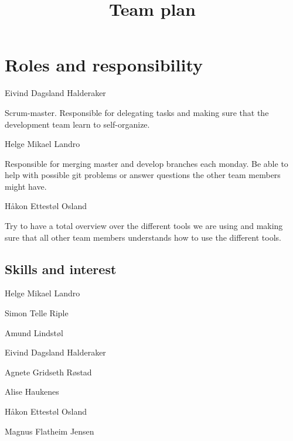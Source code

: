\documentclass{article}
\title{Team plan}
\begin{document}
\date{}
\maketitle
{}

\section*{Roles and responsibility}
\begin{description}[align=right]
\item [Leader:] \hspace{6 mm} Eivind Dagsland Halderaker
\item \hspace*{4 mm} Scrum-master. Responsible for delegating tasks and making sure that the development team learn to self-organize. 
\item [Git repo:] \hspace{6 mm} Helge Mikael Landro
\item \hspace*{4 mm} Responsible for merging master and develop branches each monday. Be able to help with possible git problems or answer questions the other team members might have.
\item [Tools:] \hspace{6 mm} Håkon Ettestøl Osland
\item \hspace*{4 mm} Try to have a total overview over the different tools we are using and making sure that all other team members understands how to use the different tools.
\end{description}

\subsection*{Skills and interest}
\begin{description}[align=right]
\item [Front end]
\item Helge Mikael Landro
\item Simon Telle Riple
\item Amund Lindstøl
\item [Back end]
\item Eivind Dagsland Halderaker
\item Agnete Gridseth Røstad
\item Alise Haukenes
\item Håkon Ettestøl Osland
\item Magnus Flatheim Jensen
\end{description}
\end{document}
